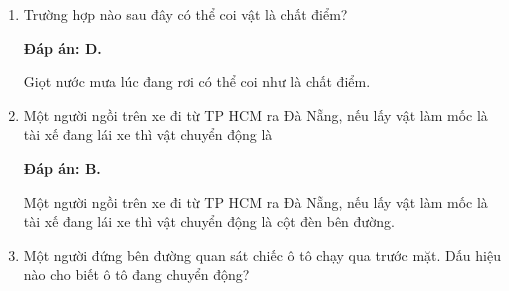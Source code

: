 \whiteBGstarBegin
\setcounter{section}{0}
\begin{enumerate}[label=\bfseries Câu \arabic*:]
	\item {}
	
	\cauhoi
	{Trường hợp nào sau đây có thể coi vật là chất điểm?
	}
	
	\loigiai
	{		\textbf{Đáp án: D.}
		
		Giọt nước mưa lúc đang rơi có thể coi như là chất điểm.
		
	}
	\item {}
	
	\cauhoi
	{Một người ngồi trên xe đi từ TP HCM ra Đà Nẵng, nếu lấy vật làm mốc là tài xế đang lái xe thì vật chuyển động là
	}
	
	\loigiai
	{		\textbf{Đáp án: B.}
		
		Một người ngồi trên xe đi từ TP HCM ra Đà Nẵng, nếu lấy vật làm mốc là tài xế đang lái xe thì vật chuyển động là cột đèn bên đường.
		
	}
	\item {}
	
	\cauhoi
	{Một người đứng bên đường quan sát chiếc ô tô chạy qua trước mặt. Dấu hiệu nào cho biết ô tô đang chuyển động? 
	}
	

\end{enumerate}
